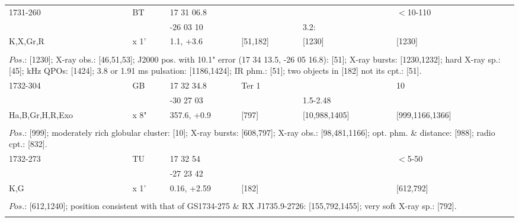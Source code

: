 \documentclass{aa}
\begin{document}
\begin{tabular}{p{2.5cm}p{1cm}p{1.8cm}p{2.3cm}p{3.3cm}p{2.0cm}p{2.2cm}}
\noalign{\smallskip}
1731-260        & BT         & 17 31 06.8         &                               &                          & $<$10-110         &          \\
                         &                & -26 03 10           &                               & 3.2:                  &                              &         \\
K,X,Gr,R         & x 1'        & 1.1, +3.6             & [51,182]               & [1230]             & [1230]                 &         \\
\\
\multicolumn{7}{p{17.5cm}}{
$Pos$.: [1230]; X-ray obs.: [46,51,53]; J2000 pos. with 10.1" error (17 34 13.5, -26 05 16.8): [51]; 
X-ray bursts: [1230,1232]; hard X-ray sp.: [45]; kHz QPOs: [1424]; 3.8 or 1.91 ms pulsation: [1186,1424]; 
IR phm.: [51]; two objects in [182] not its cpt.: [51].}\\
\noalign{\smallskip}
\hline

\noalign{\smallskip}
1732-304                 & GB        & 17 32 34.8           & Ter 1              &                                     & 10                            &          \\
                                  &               & -30 27 03             &                         & 1.5-2.48                      &                                 &         \\
Ha,B,Gr,H,R,Exo  & x 8"       & 357.6, +0.9          & [797]               & [10,988,1405]            & [999,1166,1366]   &          \\
\\
\multicolumn{7}{p{17.5cm}}{
$Pos$.: [999]; moderately rich globular cluster: [10]; X-ray bursts: [608,797]; X-ray obs.: [98,481,1166]; opt. phm. \& 
distance: [988]; radio cpt.: [832].}\\
\noalign{\smallskip}
\hline

\noalign{\smallskip}
1732-273         & TU         & 17 32 54              &                    &                     & $<$5-50    &           \\
                          &               & -27 23 42             &                    &                      &                   &               \\
K,G                   & x 1'        & 0.16, +2.59          & [182]          &                      & [612,792]  &         \\
\\
\multicolumn{7}{p{17.5cm}}{
$Pos$.: [612,1240]; position consistent with that of GS1734-275 \& RX J1735.9-2726: [155,792,1455]; 
very soft X-ray sp.: [792].}\\
\noalign{\smallskip}
\hline


\end{tabular}
\end{document}
